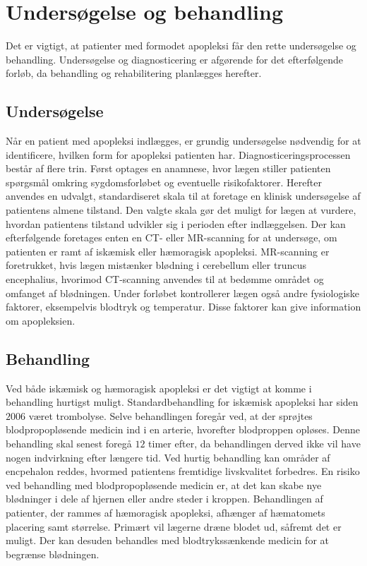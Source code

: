 \section{Undersøgelse og behandling}
Det er vigtigt, at patienter med formodet apopleksi får den rette undersøgelse og behandling. Undersøgelse og diagnosticering er afgørende for det efterfølgende forløb, da behandling og rehabilitering planlægges herefter. \cite{Sundhedsstyrelsen2009}

\subsection{Undersøgelse}
Når en patient med apopleksi indlægges, er grundig undersøgelse nødvendig for at identificere, hvilken form for apopleksi patienten har. 
Diagnosticeringsprocessen består af flere trin. Først optages en anamnese, hvor lægen stiller patienten spørgsmål omkring sygdomsforløbet og eventuelle risikofaktorer. Herefter anvendes en udvalgt, standardiseret skala til at foretage en klinisk undersøgelse af patientens almene tilstand. Den valgte skala gør det muligt for lægen at vurdere, hvordan patientens tilstand udvikler sig i perioden efter indlæggelsen.
Der kan efterfølgende foretages enten en CT- eller MR-scanning for at undersøge, om patienten er ramt af iskæmisk eller hæmoragisk apopleksi. MR-scanning er foretrukket, hvis lægen mistænker blødning i cerebellum eller truncus encephalius, hvorimod CT-scanning anvendes til at bedømme området og omfanget af blødningen. Under forløbet kontrollerer lægen også andre fysiologiske faktorer, eksempelvis blodtryk og temperatur. Disse faktorer kan give information om apopleksien. \cite{Sundhedsstyrelsen2009,Schulze2011} 

\subsection{Behandling}
Ved både iskæmisk og hæmoragisk apopleksi er det vigtigt at komme i behandling hurtigst muligt. \cite{Soenderborg2013}  
Standardbehandling for iskæmisk apopleksi har siden $2006$ været trombolyse. Selve behandlingen foregår ved, at der sprøjtes blodpropopløsende medicin ind i en arterie, hvorefter blodproppen opløses. Denne behandling skal senest foregå $12$ timer efter, da behandlingen derved ikke vil have nogen indvirkning efter længere tid. Ved hurtig behandling kan områder af encpehalon reddes, hvormed patientens fremtidige livskvalitet forbedres. En risiko ved behandling med blodpropopløsende medicin er, at det kan skabe nye blødninger i dele af hjernen eller andre steder i kroppen. \cite{Hjernesagen2015b} Behandlingen af patienter, der rammes af hæmoragisk apopleksi, afhænger af hæmatomets placering samt størrelse. Primært vil lægerne dræne blodet ud, såfremt det er muligt. Der kan desuden behandles med blodtrykssænkende medicin for at begrænse blødningen. \cite{Caplan2006} 

